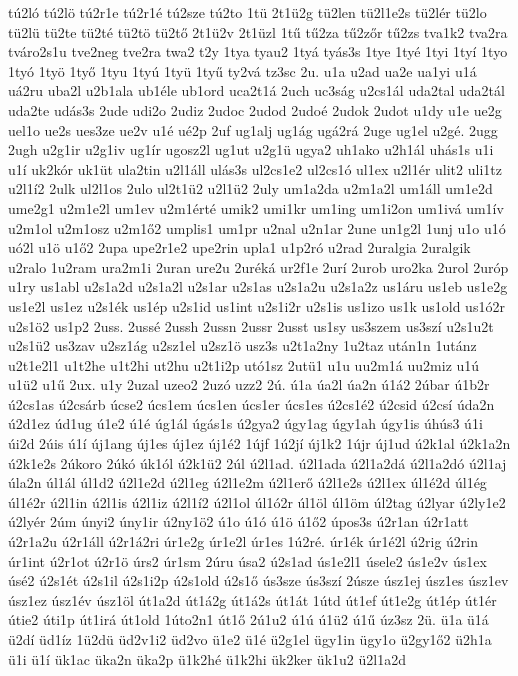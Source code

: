 {tú2ló
tú2lö
tú2r1e
tú2r1é
tú2sze
tú2to
1tü
2t1ü2g
tü2len
tü2l1e2s
tü2lér
tü2lo
tü2lü
tü2te
tü2té
tü2tö
tü2tő
2t1ü2v
2t1üzl
1tű
tű2za
tű2zőr
tű2zs
tva1k2
tva2ra
tváro2s1u
tve2neg
tve2ra
twa2
t2y
1tya
tyau2
1tyá
tyás3s
1tye
1tyé
1tyi
1tyí
1tyo
1tyó
1työ
1tyő
1tyu
1tyú
1tyü
1tyű
ty2vá
tz3sc
2u.
u1a
u2ad
ua2e
ua1yi
u1á
uá2ru
uba2l
u2b1ala
ub1éle
ub1ord
uca2t1á
2uch
uc3ság
u2cs1ál
uda2tal
uda2tál
uda2te
udás3s
2ude
udi2o
2udiz
2udoc
2udod
2udoé
2udok
2udot
u1dy
u1e
ue2g
uel1o
ue2s
ues3ze
ue2v
u1é
ué2p
2uf
ug1alj
ug1ág
ugá2rá
2uge
ug1el
u2gé.
2ugg
2ugh
u2g1ir
u2g1iv
ug1ír
ugosz2l
ug1ut
u2g1ü
ugya2
uh1ako
u2h1ál
uhás1s
u1i
u1í
uk2kór
uk1üt
ula2tin
u2l1áll
ulás3s
ul2cs1e2
ul2cs1ó
ul1ex
u2l1ér
ulit2
uli1tz
u2l1í2
2ulk
ul2l1os
2ulo
ul2t1ü2
u2l1ü2
2uly
um1a2da
u2m1a2l
um1áll
um1e2d
ume2g1
u2m1e2l
um1ev
u2m1érté
umik2
umi1kr
um1ing
um1i2on
um1ivá
um1ív
u2m1ol
u2m1osz
u2m1ő2
umplis1
um1pr
u2nal
u2n1ar
2une
un1g2l
1unj
u1o
u1ó
uó2l
u1ö
u1ő2
2upa
upe2r1e2
upe2rin
upla1
u1p2ró
u2rad
2uralgia
2uralgik
u2ralo
1u2ram
ura2m1i
2uran
ure2u
2uréká
ur2f1e
2urí
2urob
uro2ka
2urol
2uróp
u1ry
us1abl
u2s1a2d
u2s1a2l
u2s1ar
u2s1as
u2s1a2u
u2s1a2z
us1áru
us1eb
us1e2g
us1e2l
us1ez
u2s1ék
us1ép
u2s1id
us1int
u2s1i2r
u2s1is
us1izo
us1k
us1old
us1ó2r
u2s1ö2
us1p2
2uss.
2ussé
2ussh
2ussn
2ussr
2usst
us1sy
us3szem
us3szí
u2s1u2t
u2s1ü2
us3zav
u2sz1ág
u2sz1el
u2sz1ö
usz3s
u2t1a2ny
1u2taz
után1n
1utánz
u2t1e2l1
u1t2he
u1t2hi
ut2hu
u2t1i2p
utó1sz
2utü1
u1u
uu2m1á
uu2miz
u1ú
u1ü2
u1ű
2ux.
u1y
2uzal
uzeo2
2uzó
uzz2
2ú.
ú1a
úa2l
úa2n
ú1á2
2úbar
ú1b2r
ú2cs1as
ú2csárb
úcse2
úcs1em
úcs1en
úcs1er
úcs1es
ú2cs1é2
ú2csid
ú2csí
úda2n
ú2d1ez
úd1ug
ú1e2
ú1é
úg1ál
úgás1s
ú2gya2
úgy1ag
úgy1ah
úgy1is
úhús3
ú1i
úi2d
2úis
ú1í
új1ang
új1es
új1ez
új1é2
1újf
1ú2jí
új1k2
1újr
új1ud
ú2k1al
ú2k1a2n
ú2k1e2s
2úkoro
2úkó
úk1ól
ú2k1ü2
2úl
ú2l1ad.
ú2l1ada
ú2l1a2dá
ú2l1a2dó
ú2l1aj
úla2n
úl1ál
úl1d2
ú2l1e2d
ú2l1eg
ú2l1e2m
ú2l1erő
ú2l1e2s
ú2l1ex
úl1é2d
úl1ég
úl1é2r
ú2l1in
ú2l1is
ú2l1iz
ú2l1í2
ú2l1ol
úl1ó2r
úl1öl
úl1öm
úl2tag
ú2lyar
ú2ly1e2
ú2lyér
2úm
únyi2
úny1ir
ú2ny1ö2
ú1o
ú1ó
ú1ö
ú1ő2
úpos3s
ú2r1an
ú2r1att
ú2r1a2u
ú2r1áll
ú2r1á2ri
úr1e2g
úr1e2l
úr1es
1ú2ré.
úr1ék
úr1é2l
ú2rig
ú2rin
úr1int
ú2r1ot
ú2r1ö
úrs2
úr1sm
2úru
úsa2
ú2s1ad
ús1e2l1
úsele2
ús1e2v
ús1ex
úsé2
ú2s1ét
ú2s1il
ú2s1i2p
ú2s1old
ú2s1ő
ús3sze
ús3szí
2úsze
úsz1ej
úsz1es
úsz1ev
úsz1ez
úsz1év
úsz1öl
út1a2d
út1á2g
út1á2s
út1át
1útd
út1ef
út1e2g
út1ép
út1ér
útie2
úti1p
út1irá
út1old
1úto2n1
út1ő
2ú1u2
ú1ú
ú1ü2
ú1ű
úz3sz
2ü.
ü1a
ü1á
ü2dí
üd1íz
1ü2dü
üd2v1i2
üd2vo
ü1e2
ü1é
ü2g1el
ügy1in
ügy1o
ü2gy1ő2
ü2h1a
ü1i
ü1í
ük1ac
üka2n
üka2p
ü1k2hé
ü1k2hi
ük2ker
ük1u2
ü2l1a2d
}
